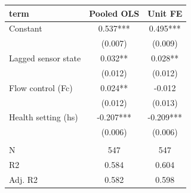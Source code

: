 \begin{tabular}{lcc}
\toprule
term & Pooled OLS & Unit FE \\
\midrule
Constant & 0.537*** & 0.495*** \\
 & (0.007) & (0.009) \\
Lagged sensor state & 0.032** & 0.028** \\
 & (0.012) & (0.012) \\
Flow control (Fc) & 0.024** & -0.012 \\
 & (0.012) & (0.013) \\
Health setting (hs) & -0.207*** & -0.209*** \\
 & (0.006) & (0.006) \\
 &  &  \\
N & 547 & 547 \\
R2 & 0.584 & 0.604 \\
Adj. R2 & 0.582 & 0.598 \\
\bottomrule
\end{tabular}